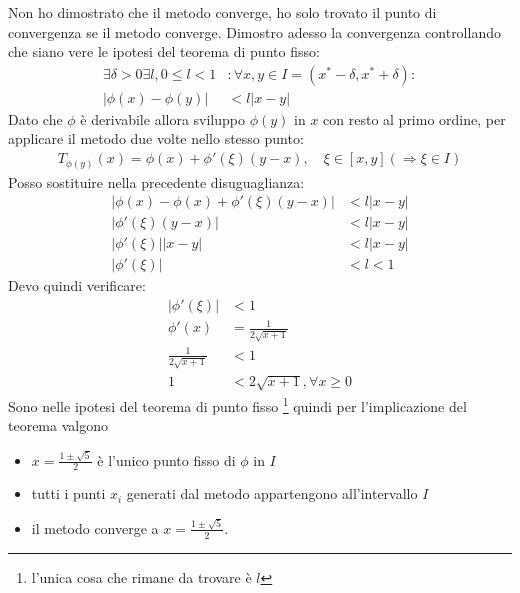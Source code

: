 Non ho dimostrato che il metodo converge, ho solo trovato il punto di
convergenza se il metodo converge. Dimostro adesso la convergenza controllando
che siano vere le ipotesi del teorema di punto fisso:
\begin{displaymath}
 \begin{split}
 	\exists \delta > 0 \exists l, 0 \leq l < 1 &: \forall x, y \in I = (x^{*} -
 	\delta, x^{*} +	\delta): \\
 	|\phi(x) - \phi(y)| &< l|x - y|
 \end{split}
\end{displaymath}
Dato che $\phi$ \`e derivabile allora sviluppo $\phi(y)$ in $x$ con resto al
primo ordine, per applicare il metodo due volte nello stesso punto:
\begin{displaymath}
 \begin{split}
 	T_{\phi(y)}(x) = \phi(x) + \phi'(\xi)(y - x), \quad \xi \in [x, y]
 	(\Rightarrow \xi \in I)
 \end{split}
\end{displaymath}
Posso sostituire nella precedente disuguaglianza:
\begin{displaymath}
 \begin{split}
 	|\phi(x) - \phi(x) + \phi'(\xi)(y - x)| &< l|x - y| \\
 	|\phi'(\xi)(y - x)| &< l|x - y| \\
 	|\phi'(\xi)||x - y| &< l|x - y| \\
 	|\phi'(\xi)| &< l < 1
 \end{split}
\end{displaymath}
Devo quindi verificare:
\begin{displaymath}
 \begin{split}
 	|\phi'(\xi)| &< 1 \\
 	\phi'(x) &= \frac{1}{2\sqrt{x + 1}} \\
 	\frac{1}{2\sqrt{x + 1}} &< 1 \\
 	1 &< 2\sqrt{x + 1}, \forall x \geq 0
 \end{split}
\end{displaymath}
Sono nelle ipotesi del teorema di punto fisso \footnote{l'unica cosa che rimane
da trovare \`e $l$} quindi per l'implicazione del teorema valgono
\begin{itemize}
  \item $x = \frac{1 \pm \sqrt{5}}{2}$ \`e l'unico punto fisso di $\phi$ in $I$
  \item tutti i punti $x_{i}$ generati dal metodo appartengono all'intervallo
  $I$
  \item il metodo converge a $x = \frac{1 \pm \sqrt{5}}{2}$.
\end{itemize}
